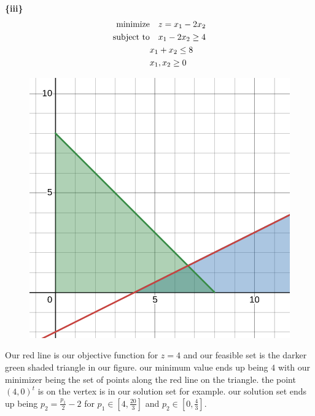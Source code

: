 \documentclass{article}
\begin{document}
\textbf{\{iii\}}
    \begin{align*}
        \text{minimize} &\null \quad z = x_1 - 2x_2 \\ 
        \text{subject to} &\null \quad x_1 - 2x_2 \geq 4 \\
        & x_1 + x_2 \leq 8 \\
        & x_1, x_2 \geq 0
    \end{align*}
    \begin{figure}[H]
        \centering
        \includegraphics[scale = 0.35]{1.1(iii).png}
    \end{figure}

Our red line is our objective function for $z = 4$ and our feasible set is the darker green shaded triangle in our figure. our minimum value ends up being $4$ with our minimizer being the set of points along the red line on the triangle. the point $(4,0)^t$ is on the vertex is in our solution set for example. our solution set ends up being $p_2 = \frac{p_1}{2}-2$ for $p_1 \in [4, \frac{20}{3}]$ and $p_2 \in [0, \frac{4}{3}]$.
\end{document}
